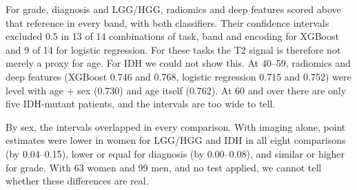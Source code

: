 \documentclass[11pt]{article}
\begin{document}
For grade, diagnosis and LGG/HGG, radiomics and deep features scored above that reference in every band, with both
classifiers. Their confidence intervals excluded 0.5 in 13 of 14 combinations of task, band and encoding for XGBoost and
9 of 14 for logistic regression. For these tasks the T2 signal is therefore not merely a proxy for age. For IDH we could
not show this. At 40--59, radiomics and deep features (XGBoost 0.746 and 0.768, logistic regression 0.715 and 0.752)
were level with age + sex (0.730) and age itself (0.762). At 60 and over there are only five IDH-mutant patients, and
the intervals are too wide to tell.

By sex, the intervals overlapped in every comparison. With imaging alone, point estimates were lower in women for
LGG/HGG and IDH in all eight comparisons (by 0.04--0.15), lower or equal for diagnosis (by 0.00--0.08), and similar or
higher for grade. With 63 women and 99 men, and no test applied, we cannot tell whether these differences are real.
\end{document}
